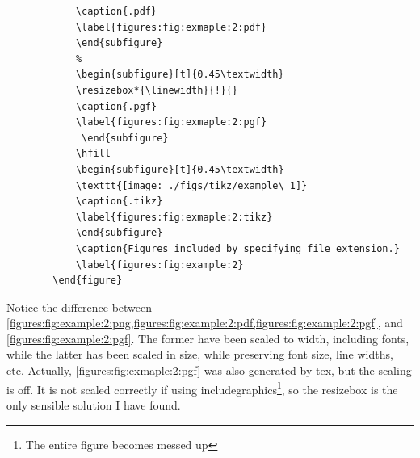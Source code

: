 \begin{verbatim}
            \caption{.pdf}
            \label{figures:fig:exmaple:2:pdf}
            \end{subfigure}
            %
            \begin{subfigure}[t]{0.45\textwidth}
            \resizebox*{\linewidth}{!}{}
            \caption{.pgf}
            \label{figures:fig:exmaple:2:pgf}
             \end{subfigure} 
            \hfill     
            \begin{subfigure}[t]{0.45\textwidth}
            \texttt{[image: ./figs/tikz/example\_1]}
            \caption{.tikz}
            \label{figures:fig:exmaple:2:tikz}
            \end{subfigure}     
            \caption{Figures included by specifying file extension.}   
            \label{figures:fig:example:2}
        \end{figure}
    \end{verbatim}

    Notice the difference between \cref{figures:fig:example:2:png,figures:fig:example:2:pdf,figures:fig:example:2:pgf}, and \cref{figures:fig:example:2:pgf}.
    The former have been scaled to width, including fonts, while the latter has been scaled in size, while preserving font size, line widths, etc.
    Actually, \cref{figures:fig:exmaple:2:pgf} was also generated by tex, but the scaling is off. It is not scaled correctly if using includegraphics\footnote{The entire figure becomes messed up},
    so the resizebox is the only sensible solution I have found. 

